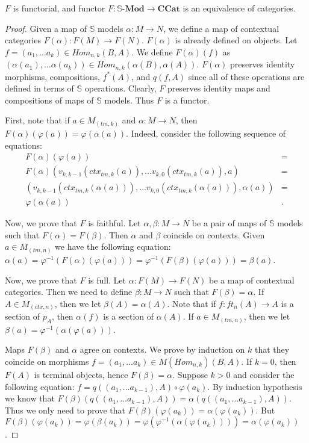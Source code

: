 \documentclass[reqno]{amsart}
\theoremstyle{definition}
\theoremstyle{remark}
\newcommand{\cat}[1]{\mathbf{#1}}
\newcommand{\ccat}{\cat{CCat}}
\newcommand{\substTh}{\mathbb{S}}
\newcommand{\Mod}[1]{#1\text{-}\cat{Mod}}
\numberwithin{figure}{section}
\begin{document}
\begin{prop}[T1-CCat]
$F$ is functorial, and functor $F : \Mod{\substTh} \to \ccat$ is an equivalence of categories.
\end{prop}
\begin{proof}
Given a map of $\substTh$ models $\alpha : M \to N$, we define a map of contextual categories $F(\alpha) : F(M) \to F(N)$.
$F(\alpha)$ is already defined on objects.
Let $f = (a_1, \ldots a_k) \in Hom_{n,k}(B,A)$.
We define $F(\alpha)(f)$ as $(\alpha(a_1), \ldots \alpha(a_k)) \in Hom_{n,k}(\alpha(B), \alpha(A))$.
$F(\alpha)$ preserves identity morphisms, compositions, $f^*(A)$, and $q(f,A)$ since all of these operations are defined in terms of $\substTh$ operations.
Clearly, $F$ preserves identity maps and compositions of maps of $\substTh$ models.
Thus $F$ is a functor.

First, note that if $a \in M_{(tm,k)}$ and $\alpha : M \to N$, then $F(\alpha)(\varphi(a)) = \varphi(\alpha(a))$.
Indeed, consider the following sequence of equations:
\begin{align*}
F(\alpha)(\varphi(a)) & = \\
F(\alpha)(v_{k,k-1}(ctx_{tm,k}(a)), \ldots v_{k,0}(ctx_{tm,k}(a)), a) & = \\
(v_{k,k-1}(ctx_{tm,k}(\alpha(a))), \ldots v_{k,0}(ctx_{tm,k}(\alpha(a))), \alpha(a)) & = \\
\varphi(\alpha(a)) & .
\end{align*}

Now, we prove that $F$ is faithful.
Let $\alpha,\beta : M \to N$ be a pair of maps of $\substTh$ models such that $F(\alpha) = F(\beta)$.
Then $\alpha$ and $\beta$ coincide on contexts.
Given $a \in M_{(tm,n)}$ we have the following equation: $\alpha(a) = \varphi^{-1}(F(\alpha)(\varphi(a))) = \varphi^{-1}(F(\beta)(\varphi(a))) = \beta(a)$.

Now, we prove that $F$ is full.
Let $\alpha : F(M) \to F(N)$ be a map of contextual categories.
Then we need to define $\beta : M \to N$ such that $F(\beta) = \alpha$.
If $A \in M_{(ctx,n)}$, then we let $\beta(A) = \alpha(A)$.
Note that if $f : ft_n(A) \to A$ is a section of $p_A$, then $\alpha(f)$ is a section of $\alpha(A)$.
If $a \in M_{(tm,n)}$, then we let $\beta(a) = \varphi^{-1}(\alpha(\varphi(a)))$.

Maps $F(\beta)$ and $\alpha$ agree on contexts.
We prove by induction on $k$ that they coincide on morphisms $f = (a_1, \ldots a_k) \in M(Hom_{n,k})(B,A)$.
If $k = 0$, then $F(A)$ is terminal objects, hence $F(\beta) = \alpha$.
Suppose $k > 0$ and consider the following equation: $f = q((a_1, \ldots a_{k-1}), A) \circ \varphi(a_k)$.
By induction hypothesis we know that $F(\beta)(q((a_1, \ldots a_{k-1}), A)) = \alpha(q((a_1, \ldots a_{k-1}), A))$.
Thus we only need to prove that $F(\beta)(\varphi(a_k)) = \alpha(\varphi(a_k))$.
But $F(\beta)(\varphi(a_k)) = \varphi(\beta(a_k)) = \varphi(\varphi^{-1}(\alpha(\varphi(a_k)))) = \alpha(\varphi(a_k))$.


\end{proof}
\end{document}
